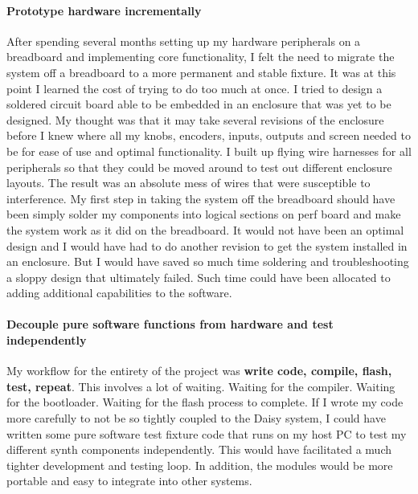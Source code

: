 \documentclass[acmlarge,screen]{acmart}
\begin{document}
	\paragraph{Prototype hardware incrementally} After spending several months setting up my hardware peripherals on a breadboard and implementing core functionality, I felt the need to migrate the system off a breadboard to a more permanent and stable fixture. It was at this point I learned the cost of trying to do too much at once. I tried to design a soldered circuit board able to be embedded in an enclosure that was yet to be designed. My thought was that it may take several revisions of the enclosure before I knew where all my knobs, encoders, inputs, outputs and screen needed to be for ease of use and optimal functionality. I built up flying wire harnesses for all peripherals so that they could be moved around to test out different enclosure layouts. The result was an absolute mess of wires that were susceptible to interference. My first step in taking the system off the breadboard should have been simply solder my components into logical sections on perf board and make the system work as it did on the breadboard. It would not have been an optimal design and I would have had to do another revision to get the system installed in an enclosure. But I would have saved so much time soldering and troubleshooting a sloppy design that ultimately failed. Such time could have been allocated to adding additional capabilities to the software.
	
	\paragraph{Decouple pure software functions from hardware and test independently} My workflow for the entirety of the project was \textbf{write code, compile, flash, test, repeat}. This involves a lot of waiting. Waiting for the compiler. Waiting for the bootloader. Waiting for the flash process to complete. If I wrote my code more carefully to not be so tightly coupled to the Daisy system, I could have written some pure software test fixture code that runs on my host PC to test my different synth components independently. This would have facilitated a much tighter development and testing loop. In addition, the modules would be more portable and easy to integrate into other systems.
	
\end{document}

